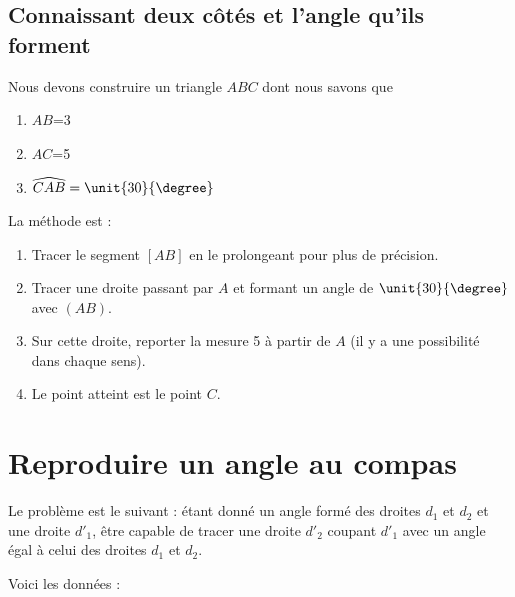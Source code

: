 \subsection{Connaissant deux côtés et l'angle qu'ils forment}

Nous devons construire un triangle \( ABC\) dont nous savons que
\begin{enumerate}
    \item
        \( AB\)=\unit{3}{\centi\meter}
    \item
        \( AC\)=\unit{5}{\centi\meter}
    \item
        \( \widehat{CAB}=\unit{30}{\degree}\)
\end{enumerate}

La méthode est :
\begin{enumerate}
    \item
        Tracer le segment \( [AB]\) en le prolongeant pour plus de précision.
    \item
        Tracer une droite passant par \( A\) et formant un angle de \( \unit{30}{\degree}\) avec \( (AB)\).
    \item
        Sur cette droite, reporter la mesure \unit{5}{\centi\meter} à partir de \( A\) (il y a une possibilité dans chaque sens).
    \item
        Le point atteint est le point \( C\).
\end{enumerate}

\section{Reproduire un angle au compas}

Le problème est le suivant : étant donné un angle formé des droites \( d_1\) et \( d_2\) et une droite \( d'_1\), être capable de tracer une droite \( d'_2\) coupant \( d'_1\) avec un angle égal à celui des droites \( d_1\) et \( d_2\).



Voici les données :

\begin{center}
   
\end{center}


